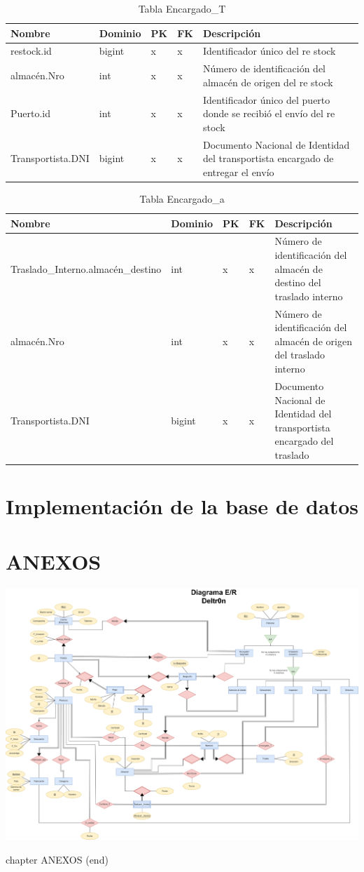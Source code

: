 \documentclass[10pt, a4paper,openany]{report}
\begin{document}
\begin{table}[h]
\centering
\begin{tabular}{|l|p{1.5cm}|p{0.5cm}|p{0.5cm}|p{3cm}|}
\hline
\textbf{Nombre} &
\textbf{Dominio} &
\textbf{PK} &
\textbf{FK} &
\textbf{Descripción} \\
\hline
restock.id & bigint & x & x & Identificador único del re stock \\
\hline
almacén.Nro & int &x & x & Número de identificación del almacén de origen del re stock \\
\hline
Puerto.id & int & x& x & Identificador único del puerto donde se recibió el envío del re stock \\
\hline
Transportista.DNI & bigint &x& x & Documento Nacional de Identidad del transportista encargado de entregar el envío \\
\hline
\end{tabular}
\caption{Tabla Encargado\_T}
\end{table}

\begin{table}[h]
\centering
\begin{tabular}{|l|p{1.5cm}|p{0.5cm}|p{0.5cm}|p{3cm}|}
\hline
\textbf{Nombre} &
\textbf{Dominio} &
\textbf{PK} &
\textbf{FK} &
\textbf{Descripción} \\
\hline
Traslado\_Interno.almacén\_destino & int & x & x & Número de identificación del almacén de destino del traslado interno \\
\hline
almacén.Nro & int & x & x & Número de identificación del almacén de origen del traslado interno \\
\hline
Transportista.DNI & bigint & x & x & Documento Nacional de Identidad del transportista encargado del traslado \\
\hline
\end{tabular}
\caption{Tabla Encargado\_a}
\end{table}

\chapter{Implementación de la base de datos} %
\label{chap:Implementación de la base de datos}



\chapter{ANEXOS} %
\label{chap:ANEXOS}
\vspace {0.5cm}
\includegraphics[width=1\textwidth]{./images/DER.png}



chapter ANEXOS (end)
\end{document}
